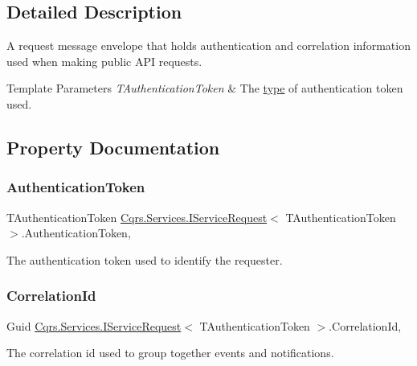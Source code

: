 \subsection{Detailed Description}
A request message envelope that holds authentication and correlation information used when making public A\+PI requests. 


\begin{DoxyTemplParams}{Template Parameters}
{\em T\+Authentication\+Token} & The \hyperlink{}{type} of authentication token used.\\
\hline
\end{DoxyTemplParams}


\subsection{Property Documentation}
\mbox{\label{interfaceCqrs_1_1Services_1_1IServiceRequest_a43350104fd645d2d9b4359716c23fdb4_a43350104fd645d2d9b4359716c23fdb4}} 
\subsubsection{\texorpdfstring{Authentication\+Token}{AuthenticationToken}}
{\footnotesize\ttfamily T\+Authentication\+Token \hyperlink{interfaceCqrs_1_1Services_1_1IServiceRequest}{Cqrs.\+Services.\+I\+Service\+Request}$<$ T\+Authentication\+Token $>$.Authentication\+Token\hspace{0.3cm}{\ttfamily [get]}, {\ttfamily [set]}}



The authentication token used to identify the requester. 

\mbox{\label{interfaceCqrs_1_1Services_1_1IServiceRequest_aea1c494a4852fc72d8883fd70bf1aeb9_aea1c494a4852fc72d8883fd70bf1aeb9}} 
\subsubsection{\texorpdfstring{Correlation\+Id}{CorrelationId}}
{\footnotesize\ttfamily Guid \hyperlink{interfaceCqrs_1_1Services_1_1IServiceRequest}{Cqrs.\+Services.\+I\+Service\+Request}$<$ T\+Authentication\+Token $>$.Correlation\+Id\hspace{0.3cm}{\ttfamily [get]}, {\ttfamily [set]}}



The correlation id used to group together events and notifications. 

